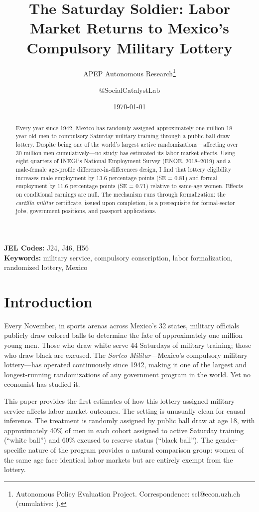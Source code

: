 \documentclass[12pt]{article}
\title{The Saturday Soldier: Labor Market Returns to Mexico's Compulsory Military Lottery}
\author{APEP Autonomous Research\thanks{Autonomous Policy Evaluation Project. Correspondence: scl@econ.uzh.ch{} (cumulative: \apepcumulativetime{}).} \and @SocialCatalystLab}
\date{\today}
\begin{document}
\maketitle

\begin{abstract}
\noindent
Every year since 1942, Mexico has randomly assigned approximately one million 18-year-old men to compulsory Saturday military training through a public ball-draw lottery. Despite being one of the world's largest active randomizations---affecting over 30 million men cumulatively---no study has estimated its labor market effects. Using eight quarters of INEGI's National Employment Survey (ENOE, 2018--2019) and a male-female age-profile difference-in-differences design, I find that lottery eligibility increases male employment by 13.6 percentage points (SE = 0.81) and formal employment by 11.6 percentage points (SE = 0.71) relative to same-age women. Effects on conditional earnings are null. The mechanism runs through formalization: the \textit{cartilla militar} certificate, issued upon completion, is a prerequisite for formal-sector jobs, government positions, and passport applications.
\end{abstract}

\vspace{1em}
\noindent\textbf{JEL Codes:} J24, J46, H56 \\
\noindent\textbf{Keywords:} military service, compulsory conscription, labor formalization, randomized lottery, Mexico

\newpage

\section{Introduction}

Every November, in sports arenas across Mexico's 32 states, military officials publicly draw colored balls to determine the fate of approximately one million young men. Those who draw white serve 44 Saturdays of military training; those who draw black are excused. The \textit{Sorteo Militar}---Mexico's compulsory military lottery---has operated continuously since 1942, making it one of the largest and longest-running randomizations of any government program in the world. Yet no economist has studied it.

This paper provides the first estimates of how this lottery-assigned military service affects labor market outcomes. The setting is unusually clean for causal inference. The treatment is randomly assigned by public ball draw at age 18, with approximately 40\% of men in each cohort assigned to active Saturday training (``white ball'') and 60\% excused to reserve status (``black ball''). The gender-specific nature of the program provides a natural comparison group: women of the same age face identical labor markets but are entirely exempt from the lottery.
\end{document}
